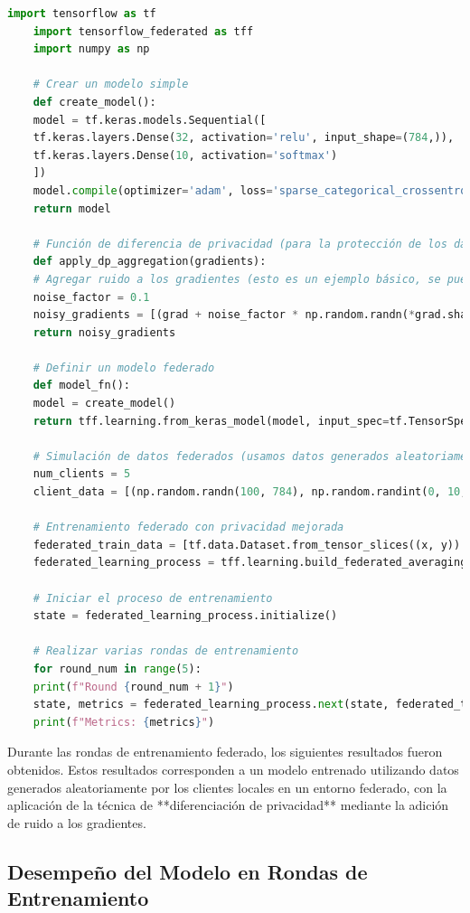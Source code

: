 \begin{lstlisting}[language=Python]
	import tensorflow as tf
	import tensorflow_federated as tff
	import numpy as np
	
	# Crear un modelo simple
	def create_model():
	model = tf.keras.models.Sequential([
	tf.keras.layers.Dense(32, activation='relu', input_shape=(784,)),
	tf.keras.layers.Dense(10, activation='softmax')
	])
	model.compile(optimizer='adam', loss='sparse_categorical_crossentropy', metrics=['accuracy'])
	return model
	
	# Función de diferencia de privacidad (para la protección de los datos)
	def apply_dp_aggregation(gradients):
	# Agregar ruido a los gradientes (esto es un ejemplo básico, se puede mejorar)
	noise_factor = 0.1
	noisy_gradients = [(grad + noise_factor * np.random.randn(*grad.shape)) for grad in gradients]
	return noisy_gradients
	
	# Definir un modelo federado
	def model_fn():
	model = create_model()
	return tff.learning.from_keras_model(model, input_spec=tf.TensorSpec([None, 784], tf.float32))
	
	# Simulación de datos federados (usamos datos generados aleatoriamente para este ejemplo)
	num_clients = 5
	client_data = [(np.random.randn(100, 784), np.random.randint(0, 10, 100)) for _ in range(num_clients)]
	
	# Entrenamiento federado con privacidad mejorada
	federated_train_data = [tf.data.Dataset.from_tensor_slices((x, y)).batch(20) for x, y in client_data]
	federated_learning_process = tff.learning.build_federated_averaging_process(model_fn)
	
	# Iniciar el proceso de entrenamiento
	state = federated_learning_process.initialize()
	
	# Realizar varias rondas de entrenamiento
	for round_num in range(5):
	print(f"Round {round_num + 1}")
	state, metrics = federated_learning_process.next(state, federated_train_data)
	print(f"Metrics: {metrics}")
\end{lstlisting}


Durante las rondas de entrenamiento federado, los siguientes resultados fueron obtenidos. Estos resultados corresponden a un modelo entrenado utilizando datos generados aleatoriamente por los clientes locales en un entorno federado, con la aplicación de la técnica de **diferenciación de privacidad** mediante la adición de ruido a los gradientes.

\subsection{Desempeño del Modelo en Rondas de Entrenamiento}

